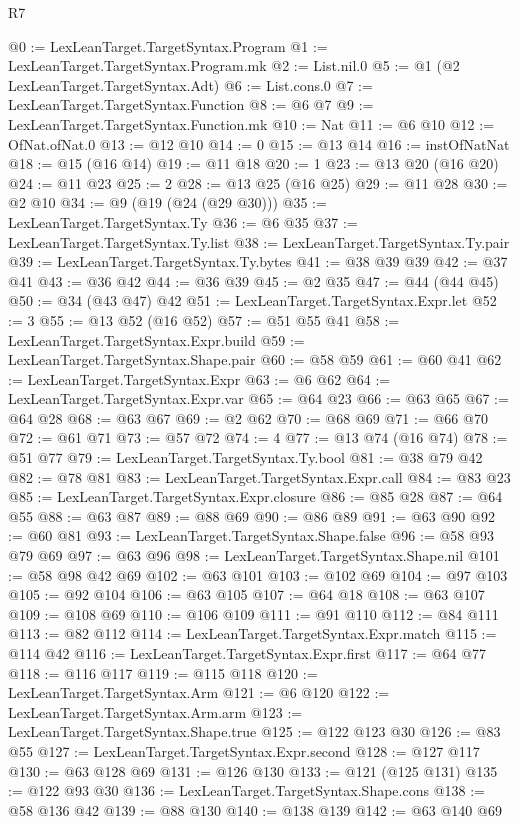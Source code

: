 \begin{lexlean}{R7}
\begin{coremodule}
@0 := LexLeanTarget.TargetSyntax.Program
@1 := LexLeanTarget.TargetSyntax.Program.mk
@2 := List.nil.{0}
@5 := @1 (@2 LexLeanTarget.TargetSyntax.Adt)
@6 := List.cons.{0}
@7 := LexLeanTarget.TargetSyntax.Function
@8 := @6 @7
@9 := LexLeanTarget.TargetSyntax.Function.mk
@10 := Nat
@11 := @6 @10
@12 := OfNat.ofNat.{0}
@13 := @12 @10
@14 := 0
@15 := @13 @14
@16 := instOfNatNat
@18 := @15 (@16 @14)
@19 := @11 @18
@20 := 1
@23 := @13 @20 (@16 @20)
@24 := @11 @23
@25 := 2
@28 := @13 @25 (@16 @25)
@29 := @11 @28
@30 := @2 @10
@34 := @9 (@19 (@24 (@29 @30)))
@35 := LexLeanTarget.TargetSyntax.Ty
@36 := @6 @35
@37 := LexLeanTarget.TargetSyntax.Ty.list
@38 := LexLeanTarget.TargetSyntax.Ty.pair
@39 := LexLeanTarget.TargetSyntax.Ty.bytes
@41 := @38 @39 @39
@42 := @37 @41
@43 := @36 @42
@44 := @36 @39
@45 := @2 @35
@47 := @44 (@44 @45)
@50 := @34 (@43 @47) @42
@51 := LexLeanTarget.TargetSyntax.Expr.let
@52 := 3
@55 := @13 @52 (@16 @52)
@57 := @51 @55 @41
@58 := LexLeanTarget.TargetSyntax.Expr.build
@59 := LexLeanTarget.TargetSyntax.Shape.pair
@60 := @58 @59
@61 := @60 @41
@62 := LexLeanTarget.TargetSyntax.Expr
@63 := @6 @62
@64 := LexLeanTarget.TargetSyntax.Expr.var
@65 := @64 @23
@66 := @63 @65
@67 := @64 @28
@68 := @63 @67
@69 := @2 @62
@70 := @68 @69
@71 := @66 @70
@72 := @61 @71
@73 := @57 @72
@74 := 4
@77 := @13 @74 (@16 @74)
@78 := @51 @77
@79 := LexLeanTarget.TargetSyntax.Ty.bool
@81 := @38 @79 @42
@82 := @78 @81
@83 := LexLeanTarget.TargetSyntax.Expr.call
@84 := @83 @23
@85 := LexLeanTarget.TargetSyntax.Expr.closure
@86 := @85 @28
@87 := @64 @55
@88 := @63 @87
@89 := @88 @69
@90 := @86 @89
@91 := @63 @90
@92 := @60 @81
@93 := LexLeanTarget.TargetSyntax.Shape.false
@96 := @58 @93 @79 @69
@97 := @63 @96
@98 := LexLeanTarget.TargetSyntax.Shape.nil
@101 := @58 @98 @42 @69
@102 := @63 @101
@103 := @102 @69
@104 := @97 @103
@105 := @92 @104
@106 := @63 @105
@107 := @64 @18
@108 := @63 @107
@109 := @108 @69
@110 := @106 @109
@111 := @91 @110
@112 := @84 @111
@113 := @82 @112
@114 := LexLeanTarget.TargetSyntax.Expr.match
@115 := @114 @42
@116 := LexLeanTarget.TargetSyntax.Expr.first
@117 := @64 @77
@118 := @116 @117
@119 := @115 @118
@120 := LexLeanTarget.TargetSyntax.Arm
@121 := @6 @120
@122 := LexLeanTarget.TargetSyntax.Arm.arm
@123 := LexLeanTarget.TargetSyntax.Shape.true
@125 := @122 @123 @30
@126 := @83 @55
@127 := LexLeanTarget.TargetSyntax.Expr.second
@128 := @127 @117
@130 := @63 @128 @69
@131 := @126 @130
@133 := @121 (@125 @131)
@135 := @122 @93 @30
@136 := LexLeanTarget.TargetSyntax.Shape.cons
@138 := @58 @136 @42
@139 := @88 @130
@140 := @138 @139
@142 := @63 @140 @69

\end{coremodule}
\end{lexlean}
